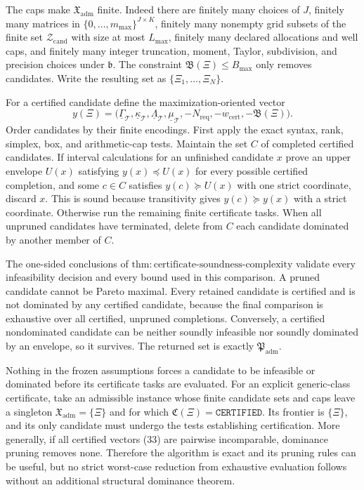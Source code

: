 The caps make \(\mathfrak X_{\mathrm{adm}}\) finite.  Indeed there are finitely many choices of \(J\), finitely many matrices in \(\{0,\ldots,m_{\max}\}^{J\times K}\), finitely many nonempty grid subsets of the finite set \(\mathcal Z_{\mathrm{cand}}\) with size at most \(L_{\max}\), finitely many declared allocations and well caps, and finitely many integer truncation, moment, Taylor, subdivision, and precision choices under \(\mathfrak b\).  The constraint \(\mathfrak B(\Xi)\leq B_{\max}\) only removes candidates.  Write the resulting set as \(\{\Xi_1,\ldots,\Xi_N\}\).

For a certified candidate define the maximization-oriented vector
\[
 y(\Xi)=\bigl(\underline\Gamma_{\mathcal T},
 \underline\kappa_{\mathcal T},
 \underline\Lambda_{\mathcal T},
 \underline\mu_{\mathcal T},
 -N_{\mathrm{req}},-w_{\mathrm{cert}},-\mathfrak B(\Xi)\bigr). \tag{33}
\]
Order candidates by their finite encodings.  First apply the exact syntax, rank, simplex, box, and arithmetic-cap tests.  Maintain the set \(C\) of completed certified candidates.  If interval calculations for an unfinished candidate \(x\) prove an upper envelope \(U(x)\) satisfying \(y(x)\preceq U(x)\) for every possible certified completion, and some \(c\in C\) satisfies \(y(c)\succeq U(x)\) with one strict coordinate, discard \(x\).  This is sound because transitivity gives \(y(c)\succeq y(x)\) with a strict coordinate.  Otherwise run the remaining finite certificate tasks.  When all unpruned candidates have terminated, delete from \(C\) each candidate dominated by another member of \(C\).

The one-sided conclusions of \(\mathrm{thm{:}certificate\text{-}soundness\text{-}complexity}\) validate every infeasibility decision and every bound used in this comparison.  A pruned candidate cannot be Pareto maximal.  Every retained candidate is certified and is not dominated by any certified candidate, because the final comparison is exhaustive over all certified, unpruned completions.  Conversely, a certified nondominated candidate can be neither soundly infeasible nor soundly dominated by an envelope, so it survives.  The returned set is exactly \(\mathfrak P_{\mathrm{adm}}\).

Nothing in the frozen assumptions forces a candidate to be infeasible or dominated before its certificate tasks are evaluated.  For an explicit generic-class certificate, take an admissible instance whose finite candidate sets and caps leave a singleton \(\mathfrak X_{\mathrm{adm}}=\{\Xi\}\) and for which \(\mathfrak C(\Xi)=\mathtt{CERTIFIED}\).  Its frontier is \(\{\Xi\}\), and its only candidate must undergo the tests establishing certification.  More generally, if all certified vectors (33) are pairwise incomparable, dominance pruning removes none.  Therefore the algorithm is exact and its pruning rules can be useful, but no strict worst-case reduction from exhaustive evaluation follows without an additional structural dominance theorem.


